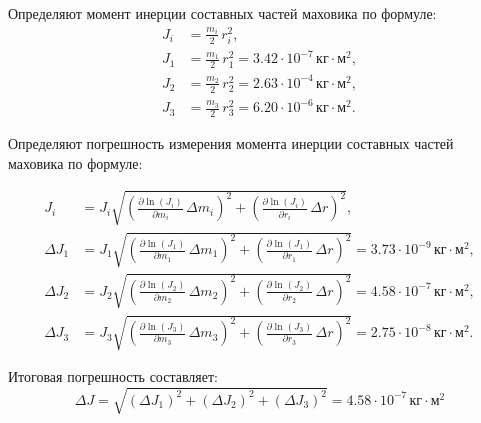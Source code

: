 Определяют момент инерции составных частей маховика по формуле:
\begin{equation}
	\begin{aligned}
		J_i &= \frac{m_i}{2} \, r_i^{2}, \\[1ex]
		J_1 &= \frac{m_1}{2} \, r_1^{2} = 3.42 \cdot 10^{-7}\,\text{кг}\cdot\text{м}^2, \\[1ex]
		J_2 &= \frac{m_2}{2} \, r_2^{2} = 2.63 \cdot 10^{-4}\,\text{кг}\cdot\text{м}^2, \\[1ex]
		J_3 &= \frac{m_3}{2} \, r_3^{2} = 6.20 \cdot 10^{-6}\,\text{кг}\cdot\text{м}^2.
	\end{aligned}
\end{equation}

Определяют погрешность измерения момента инерции составных частей маховика по формуле:

\begin{equation}
	\begin{aligned}
		J_i &= J_i \sqrt{
			\left( \frac{\partial \ln(J_i)}{\partial m_i}\,\Delta m_i \right)^{2} +
			\left( \frac{\partial \ln(J_i)}{\partial r_i}\,\Delta r \right)^{2}}, \\[1ex]
		\Delta J_1 &= J_1 \sqrt{
			\left( \frac{\partial \ln(J_1)}{\partial m_1}\,\Delta m_1 \right)^{2} +
			\left( \frac{\partial \ln(J_1)}{\partial r_1}\,\Delta r \right)^{2}}
		= 3.73 \cdot 10^{-9}\,\text{кг}\cdot\text{м}^2, \\[1ex]
		\Delta J_2 &= J_2 \sqrt{
			\left( \frac{\partial \ln(J_2)}{\partial m_2}\,\Delta m_2 \right)^{2} +
			\left( \frac{\partial \ln(J_2)}{\partial r_2}\,\Delta r \right)^{2}}
		= 4.58 \cdot 10^{-7}\,\text{кг}\cdot\text{м}^2, \\[1ex]
		\Delta J_3 &= J_3 \sqrt{
			\left( \frac{\partial \ln(J_3)}{\partial m_3}\,\Delta m_3 \right)^{2} +
			\left( \frac{\partial \ln(J_3)}{\partial r_3}\,\Delta r \right)^{2}}
		= 2.75 \cdot 10^{-8}\,\text{кг}\cdot\text{м}^2.
	\end{aligned}
\end{equation}

Итоговая погрешность составляет:
\begin{equation}
	\Delta J = \sqrt{ (\Delta J_1)^2 + (\Delta J_2)^2 + (\Delta J_3)^2 }
	= 4.58 \cdot 10^{-7}\,\text{кг}\cdot\text{м}^2
\end{equation}

 

\clearpage
{}


